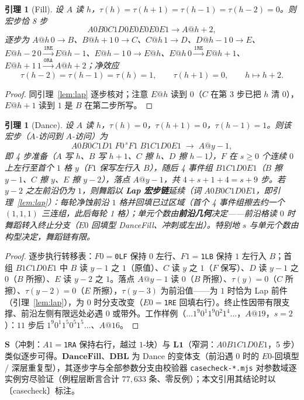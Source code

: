 \documentclass[11pt]{ctexart}
\newtheorem{lemma}[theorem]{引理}
\begin{document}
\begin{lemma}[Fill]\label{lem:fill}
设 $A$ 读 $h$，$\tau(h)=\tau(h{+}1)=\tau(h{-}1)=\tau(h{-}2)=0$。则宏步恰 8 步
\[
A0B0C1D0E0E0E0E1 \to A@h{+}2,
\]
逐步为 $A@h\,0{\to}B$、$B@h{+}1\,0{\to}C$、$C@h\,1{\to}D$、$D@h{-}1\,0{\to}E$、$E@h{-}2\,0{\xrightarrow{\texttt{1RE}}}E@h{-}1$、$E@h{-}1\,0{\to}E@h$、$E@h\,0{\xrightarrow{\texttt{1RE}}}E@h{+}1$、$E@h{+}1\,1{\xrightarrow{\texttt{0RA}}}A@h{+}2$；净效应
\[
\tau(h{-}2)=\tau(h{-}1)=\tau(h)=1,\qquad \tau(h{+}1)=0,\qquad h\mapsto h+2 .
\]
\end{lemma}
\begin{proof}
同引理~\ref{lem:lap} 逐步核对；注意 $E@h$ 读到 $0$（$C$ 在第 3 步已把 $h$ 清 0），$E@h{+}1$ 读到 $1$ 是 $B$ 在第二步所写。
\end{proof}

\begin{lemma}[Dance]\label{lem:dance}
设 $A$ 读 $h$，$\tau(h)=0$，$\tau(h{+}1)=0$，$\tau(h{-}1)=1$。则该宏步（$A$-访问到 $A$-访问）为
\[
A0B0C1D1 \; F0^{\,s}F1 \; B1C1D0E1 \;\to\; A@y{-}1,
\]
即 4 步准备（$A$ 写 $h$、$B$ 写 $h{+}1$、$C$ 擦 $h$、$D$ 擦 $h{-}1$），$F$ 在 $s\ge 0$ 个连续 $0$ 上左行至首个 $1$ 格 $y$（$F1$ 保写左行入 $B$），随后 4 事件组 $B1C1D0E1$（$B$ 擦 $y{-}1$、$C$ 擦 $y$、$E$ 擦 $y{-}2$），落点 $A@y{-}1$，共 $4+s+1+4=s+9$ 步。若 $y{-}2$ 之左前沿仍为 $1$，则舞蹈以 \textbf{Lap 宏步链}延续（词 $A0B0C1D0E1$，即引理~\ref{lem:lap}）：每轮净蚀前沿 $1$ 格并回填已过区域（首个 4 事件组擦去约一个 $(1,1,1)$ 三连组，此后每轮 1 格）；单元个数由\textbf{前沿几何}决定——前沿格读 $0$ 时舞蹈转入终止分支（$E0$ 回填型 DanceFill、冲刺或左出）。特别地 $s$ 与单元个数由构型决定，舞蹈链有限。
\end{lemma}
\begin{proof}
逐步执行转移表：$F0=$\texttt{0LF} 保持 $0$ 左行、$F1=$\texttt{1LB} 保持 $1$ 左行入 $B$；首组 $B1C1D0E1$ 中 $B$ 读 $y{-}1$ 之 $1$（原值）、$C$ 读 $y$ 之 $1$（$F$ 保写）、$D$ 读 $y{-}1$ 之 $0$（$B$ 所擦）、$E$ 读 $y{-}2$ 之 $1$。落点 $A@y{-}1$ 读 $0$（$B$ 所擦）、$\tau(y)=0$（$C$ 所擦）、$\tau(y{-}2)=0$（$E$ 所擦），$\tau(y{-}3)$ 为前沿值——为 $1$ 时恰为 Lap 前件（引理~\ref{lem:lap}），为 $0$ 时分支改变（$E0{=}$\texttt{1RE} 回填右行）。终止性因带有限支撑、前沿左侧有限远处必遇 $0$ 或带外。工作样例（$\dots1^9 0^1 1^9 0^2 1^4\dots$，$A@19$，$s{=}2$）：$11$ 步后 $1^9 0^1 1^5 0^5 1^5\dots$、$A@16$。
\end{proof}

$\mathbf S$（冲刺：$A1=$\texttt{1RA} 保持右行，越过 $1$-块）与 $\mathbf{L1}$（窄洞：$A0B1C1D0E1$，5 步）类似逐步可得。$\mathbf{DanceFill}$、$\mathbf{DBL}$ 为 Dance 的变体支（前沿遇 $0$ 时的 $E0$-回填型 / 深层重复型），其逐步字与全部参数分支由校验器 \texttt{casecheck-*.mjs} 对参数域逐实例穷尽验证（例程层断言合计 $77{,}633$ 条、零反例）；本文引用其结论时以〔casecheck〕标注。
\end{document}
